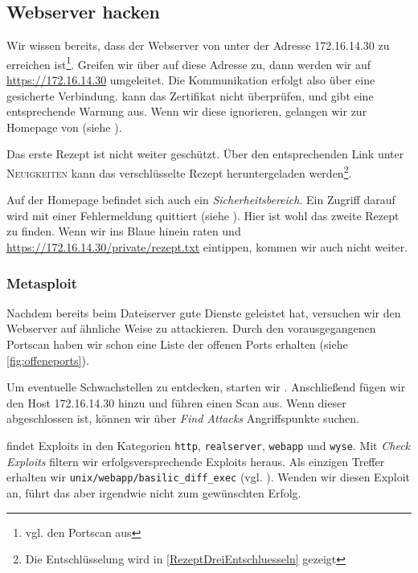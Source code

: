 \subsection{Webserver hacken}

Wir wissen bereits, dass der Webserver von \Mayerbrot{} unter der Adresse
172.16.14.30 zu erreichen ist\footnote{vgl. den Portscan aus
  }. Greifen wir über \Firefox{} auf diese Adresse zu,
dann werden wir auf \url{https://172.16.14.30} umgeleitet. Die Kommunikation
erfolgt also über eine gesicherte Verbindung. \Firefox{} kann das Zertifikat
nicht überprüfen, und gibt eine entsprechende Warnung aus. Wenn wir diese
ignorieren, gelangen wir zur Homepage von \Mayerbrot{} (siehe
).


Das erste Rezept ist nicht weiter geschützt. Über den entsprechenden Link unter
\textsc{Neuigkeiten} kann das verschlüsselte Rezept heruntergeladen
werden\footnote{Die Entschlüsselung wird in \cref{RezeptDreiEntschluesseln}
  gezeigt}.

Auf der Homepage befindet sich auch ein \emph{Sicherheitsbereich}. Ein Zugriff
darauf wird mit einer Fehlermeldung quittiert (siehe
). Hier ist wohl das zweite Rezept zu finden. Wenn wir
ins Blaue hinein raten und \url{https://172.16.14.30/private/rezept.txt}
eintippen, kommen wir auch nicht weiter.


\subsubsection{Metasploit}

Nachdem \Metasploit{} bereits beim Dateiserver gute Dienste geleistet hat,
versuchen wir den Webserver auf ähnliche Weise zu attackieren. Durch den
vorausgegangenen Portscan haben wir schon eine Liste der
offenen Ports erhalten (siehe \cref{fig:offeneports}).

Um eventuelle Schwachstellen zu entdecken, starten wir \Armitage{}. Anschließend
fügen wir den Host 172.16.14.30 hinzu und führen einen Scan aus. Wenn dieser
abgeschlossen ist, können wir über \emph{\glqq{}Find Attacks\grqq{}}
Angriffspunkte suchen.

\Armitage{} findet Exploits in den Kategorien \texttt{http},
\texttt{realserver}, \texttt{webapp} und \texttt{wyse}. Mit \emph{\glqq{}Check
  Exploits\grqq{}} filtern wir erfolgsversprechende Exploits heraus. Als
einzigen Treffer erhalten wir \texttt{unix/webapp/basilic\_diff\_exec}
(vgl. ). Wenden wir diesen Exploit an, führt das aber
irgendwie nicht zum gewünschten Erfolg.

